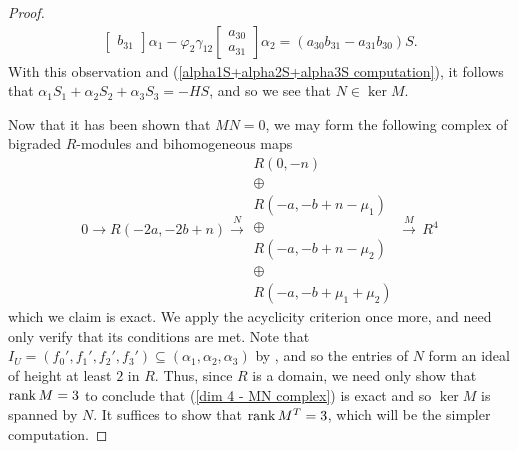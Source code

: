 \documentclass[reqno]{amsart}
\numberwithin{equation}{section}
\theoremstyle{definition}
\def\rk{\mathop{\rm rank}}
\begin{document}
\begin{proof}
\[\begin{array}{l}
\begin{bmatrix}
                 b_{31}
             \end{bmatrix}\alpha_1-\varphi_2\gamma_{12}\begin{bmatrix}
                 a_{30}\\
                 a_{31}
             \end{bmatrix}\alpha_2= (a_{30}b_{31}-a_{31}b_{30})S.
\end{array}
\]
With this observation and (\ref{alpha1S+alpha2S+alpha3S computation}), it follows that $\alpha_1S_1 + \alpha_2S_2+\alpha_3S_3 = -HS$, and so we see that $N\in \ker M$.





Now that it has been shown that $MN=0$, we may form the following complex of bigraded $R$-modules and bihomogeneous maps
\begin{equation}\label{dim 4 - MN complex}
 0 \rightarrow R(-2a,-2b+n) \overset{N}{\longrightarrow} \begin{array}{c}
 R(0,-n)\\
 \oplus \\
R(-a,-b+n-\mu_1)\\
 \oplus \\
R(-a,-b+n-\mu_2)\\
\oplus\\
R(-a,-b+\mu_1+\mu_2)
\end{array} \overset{M}{\longrightarrow} \,
R^4
\end{equation}
which we claim is exact. We apply the acyclicity criterion \cite[Cor. 1]{BE73} once more, and need only verify that its conditions are met. Note that $I_U = (f_0',f_1',f_2',f_3') \subseteq (\alpha_1,\alpha_2,\alpha_3)$ by , and so the entries of $N$ form an ideal of height at least $2$ in $R$. Thus, since $R$ is a domain, we need only show that $\rk M=3$ to conclude that (\ref{dim 4 - MN complex}) is exact and so $\ker M$ is spanned by $N$. It suffices to show that $\rk M^T =3$, which will be the simpler computation. 


\end{proof}
\end{document}
